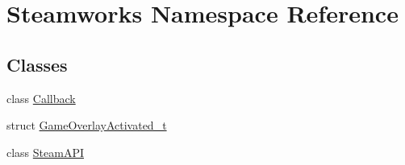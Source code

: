 \hypertarget{namespaceSteamworks}{}\section{Steamworks Namespace Reference}
\label{namespaceSteamworks}
\subsection*{Classes}
\begin{DoxyCompactItemize}
\item 
class \hyperlink{classSteamworks_1_1Callback}{Callback}
\item 
struct \hyperlink{structSteamworks_1_1GameOverlayActivated__t}{Game\+Overlay\+Activated\+\_\+t}
\item 
class \hyperlink{classSteamworks_1_1SteamAPI}{Steam\+A\+P\+I}
\end{DoxyCompactItemize}
